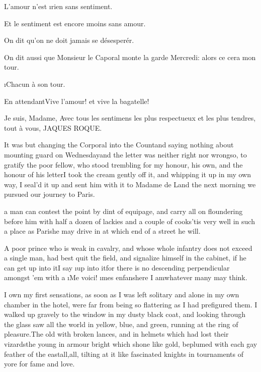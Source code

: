 \documentclass[twoside]{article}
\begin{document}
L’amour n’est \i{rien} sans sentiment.

Et le sentiment est encore \i{moins} sans amour.

On dit qu’on ne doit jamais se désesperér.

On dit aussi que Monsieur le Caporal monte la garde Mercredi: alors ce
cera mon tour.

                           \i{Chacun à son tour}.

En attendant\tsk Vive l’amour! et vive la bagatelle!

                                                          Je suis, Madame,
                                          Avec tous les sentimens les plus
                                          respectueux et les plus tendres,
                                                              tout à vous,
                                                             JAQUES ROQUE.

It was but changing the Corporal into the Count\tsk and saying nothing about
mounting guard on Wednesday\tsk and the letter was neither right nor
wrong\tsk so, to gratify the poor fellow, who stood trembling for my honour,
his own, and the honour of his letter\tsk I took the cream gently off it,
and whipping it up in my own way, I seal’d it up and sent him with it to
Madame de L\astiii \tsk and the next morning we pursued our journey to Paris.






 a man can contest the point by dint of equipage, and carry all on
floundering before him with half a dozen of lackies and a couple of
cooks\tsk ’tis very well in such a place as Paris\tsk he may drive in at which
end of a street he will.

A poor prince who is weak in cavalry, and whose whole infantry does not
exceed a single man, had best quit the field, and signalize himself in
the cabinet, if he can get up into it\tsk I say \i{up into it}\tsk for there is no
descending perpendicular amongst ’em with a \lqq \i{Me voici!} \i{mes
enfans}\rqq\tsk here I am\tsk whatever many may think.

I own my first sensations, as soon as I was left solitary and alone in my
own chamber in the hotel, were far from being so flattering as I had
prefigured them.  I walked up gravely to the window in my dusty black
coat, and looking through the glass saw all the world in yellow, blue,
and green, running at the ring of pleasure.\tsk The old with broken lances,
and in helmets which had lost their vizards\tsk the young in armour bright
which shone like gold, beplumed with each gay feather of the
east\tsk all,\tsk all, tilting at it like fascinated knights in tournaments of
yore for fame and love.\tsk 
\end{document}
